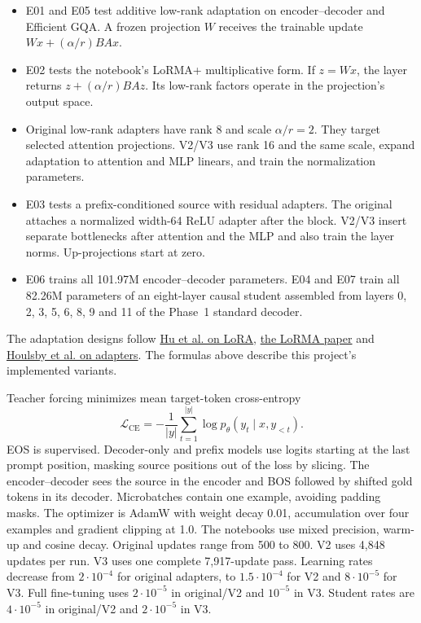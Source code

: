 \begin{itemize}[leftmargin=*]
\item E01 and E05 test additive low-rank adaptation on encoder--decoder and
Efficient GQA. A frozen projection \(W\) receives the trainable update
\(Wx+(\alpha/r)BAx\).
\item E02 tests the notebook's LoRMA+ multiplicative form. If \(z=Wx\), the
layer returns \(z+(\alpha/r)BAz\). Its low-rank factors operate in the
projection's output space.
\item Original low-rank adapters have rank 8 and scale \(\alpha/r=2\).
They target selected attention projections. V2/V3 use rank 16 and the same
scale, expand adaptation to attention and MLP linears, and train the
normalization parameters.
\item E03 tests a prefix-conditioned source with residual adapters. The
original attaches a normalized width-64 ReLU adapter after the block.
V2/V3 insert separate bottlenecks after attention and the MLP and also train
the layer norms. Up-projections start at zero.
\item E06 trains all 101.97M encoder--decoder parameters. E04 and E07 train
all 82.26M parameters of an eight-layer causal student assembled from layers
0, 2, 3, 5, 6, 8, 9 and 11 of the Phase~1 standard decoder.
\end{itemize}

The adaptation designs follow
\href{https://arxiv.org/abs/2106.09685}{Hu et al. on LoRA},
\href{https://arxiv.org/abs/2506.07621}{the LoRMA paper} and
\href{https://proceedings.mlr.press/v97/houlsby19a.html}{Houlsby et al. on adapters}.
The formulas above describe this project's implemented variants.

Teacher forcing minimizes mean target-token cross-entropy
\[
 \mathcal L_{\mathrm{CE}}=-\frac{1}{|y|}\sum_{t=1}^{|y|}
 \log p_\theta(y_t\mid x,y_{<t}).
\]
EOS is supervised. Decoder-only and prefix models use logits starting at the
last prompt position, masking source positions out of the loss by slicing.
The encoder--decoder sees the source in the encoder and BOS followed by
shifted gold tokens in its decoder. Microbatches contain one example, avoiding
padding masks. The optimizer is AdamW with weight decay 0.01, accumulation
over four examples and gradient clipping at 1.0. The notebooks use mixed
precision, warm-up and cosine decay. Original updates range from 500 to
800. V2 uses 4,848 updates per run. V3 uses one complete 7,917-update pass.
Learning rates decrease from \(2\cdot10^{-4}\) for original adapters, to
\(1.5\cdot10^{-4}\) for V2 and \(8\cdot10^{-5}\) for V3. Full fine-tuning
uses \(2\cdot10^{-5}\) in original/V2 and \(10^{-5}\) in V3.
Student rates are \(4\cdot10^{-5}\) in original/V2 and \(2\cdot10^{-5}\) in V3.

